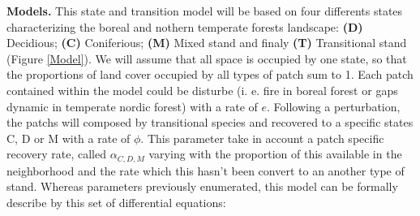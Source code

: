 \textbf{Models.} This state and transition model will be based on four
differents states characterizing the boreal and nothern temperate forests
landscape: \textbf{(D)} Decidious; \textbf{(C)} Coniferious; \textbf{(M)}
Mixed stand and finaly \textbf{(T)} Transitional stand (Figure \ref{Model}).
We will assume that all space is occupied by one state, so that the
proportions of land cover occupied by all types of patch sum to 1. Each patch
contained within the model could be disturbe (i. e. fire in boreal forest or
gaps dynamic in temperate nordic forest) with a rate of $e$. Following a
perturbation, the patchs will composed by transitional species and recovered
to a specific states C, D or M with a rate of $\phi$. This parameter take in
account a patch specific recovery rate, called $\alpha_{C,D,M}$ varying with
the proportion of this available in the neighborhood and
the rate which this hasn't been convert to an another type of
stand.  Whereas parameters previously enumerated, this model can be formally
describe by this set of differential equations:


